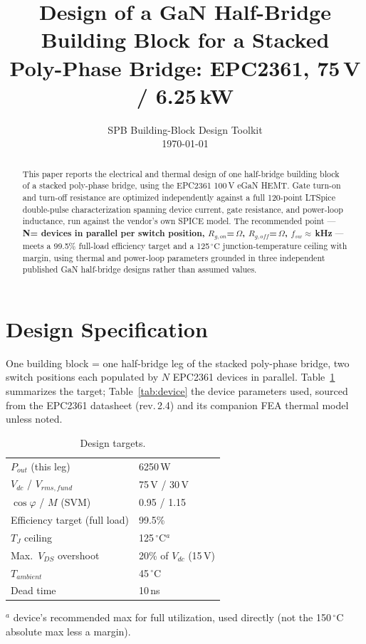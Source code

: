 \documentclass[10pt,twocolumn]{article}
\title{\vspace{-1em}\textbf{\large Design of a GaN Half-Bridge Building Block for a Stacked\\
Poly-Phase Bridge: EPC2361, 75\,V / 6.25\,kW}\vspace{-0.5em}}
\author{\footnotesize SPB Building-Block Design Toolkit \\[-0.3em] \footnotesize \today}
\date{}
\newcommand{\ohm}{\ensuremath{\Omega}}
\newcommand{\degC}{\ensuremath{^{\circ}\mathrm{C}}}
\begin{document}
\maketitle

\begin{abstract}
\noindent This paper reports the electrical and thermal design of one half-bridge
building block of a stacked poly-phase bridge, using the EPC2361 100\,V eGaN HEMT. Gate
turn-on and turn-off resistance are optimized independently against a full 120-point
LTSpice double-pulse characterization spanning device current, gate resistance, and
power-loop inductance, run against the vendor's own SPICE model. The recommended point
--- \textbf{N=\NVAL{} devices in parallel per switch position, $R_{g,on}$=\RGONVAL\,\ohm,
$R_{g,off}$=\RGOFFVAL\,\ohm, $f_{sw}\approx$\FSWVAL\,kHz} --- meets a 99.5\% full-load
efficiency target and a 125\,\degC{} junction-temperature ceiling with margin, using
thermal and power-loop parameters grounded in three independent published GaN
half-bridge designs rather than assumed values.
\end{abstract}

\section{Design Specification}

One building block = one half-bridge leg of the stacked poly-phase bridge, two switch
positions each populated by $N$ EPC2361 devices in parallel. Table~\ref{tab:spec}
summarizes the target; Table~\ref{tab:device} the device parameters used, sourced from
the EPC2361 datasheet (rev.\,2.4) and its companion FEA thermal model unless noted.

\begin{table}[h]
\centering\footnotesize
\caption{Design targets.}
\label{tab:spec}
\begin{tabular}{@{}ll@{}}
\toprule
$P_{out}$ (this leg) & 6250\,W \\
$V_{dc}$ / $V_{rms,fund}$ & 75\,V / 30\,V \\
$\cos\varphi$ / $M$ (SVM) & 0.95 / 1.15 \\
Efficiency target (full load) & 99.5\% \\
$T_J$ ceiling & 125\,\degC$^{a}$ \\
Max.\ $V_{DS}$ overshoot & 20\% of $V_{dc}$ (15\,V) \\
$T_{ambient}$ & 45\,\degC \\
Dead time & 10\,ns \\
\bottomrule
\end{tabular}
\vspace{2pt}
\raggedright\footnotesize $^a$ device's recommended max for full utilization, used
directly (not the 150\,\degC{} absolute max less a margin).
\end{table}
\end{document}
